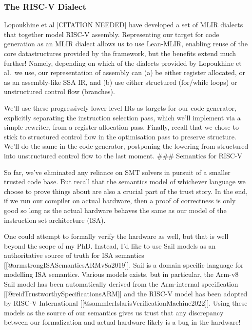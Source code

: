 \subsubsection{The RISC-V Dialect}\label{the-risc-v-dialect}

Lopoukhine et al {[}CITATION NEEDED{]} have developed a set of MLIR
dialects that together model RISC-V assembly. Representing our target
for code generation as an MLIR dialect allows us to use Lean-MLIR,
enabling reuse of the core datastructures provided by the framework, but
the benefits extend much further! Namely, depending on which of the
dialects provided by Lopoukhine et al.~we use, our representation of
assembly can (a) be either register allocated, or as an assembly-like
SSA IR, and (b) use either structured (for/while loops) or unstructured
control flow (branches).

We'll use these progressively lower level IRs as targets for our code
generator, explicitly separating the instruction selection pass, which
we'll implement via a simple rewriter, from a register allocation pass.
Finally, recall that we chose to stick to structured control flow in the
optimisation pass to preserve structure. We'll do the same in the code
generator, postponing the lowering from structured into unstructured
control flow to the last moment. \#\#\# Semantics for RISC-V

So far, we've eliminated any reliance on SMT solvers in pursuit of a
smaller trusted code base. But recall that the semantics model of
whichever language we choose to prove things about are also a crucial
part of the trust story. In the end, if we run our compiler on actual
hardware, then a proof of correctness is only good so long as the actual
hardware behaves the same as our model of the instruction set
architecture (ISA).

One could attempt to formally verify the hardware as well, but that is
well beyond the scope of my PhD. Instead, I'd like to use Sail models as
an authoritative source of truth for ISA semantics
{[}{[}@armstrongISASemanticsARMv8a2019{]}{]}. Sail is a domain specific
language for modelling ISA semantics. Various models exists, but in
particular, the Arm-v8 Sail model has been automatically derived from
the Arm-internal specification
{[}{[}@reidTrustworthySpecificationsARM{]}{]} and the RISC-V model has
been adopted by RISC-V International
{[}{[}@sammlerIslarisVerificationMachine2022{]}{]}. Using these models
as the source of our semantics gives us trust that any discrepancy
between our formalization and actual hardware likely is a bug in the
hardware!

